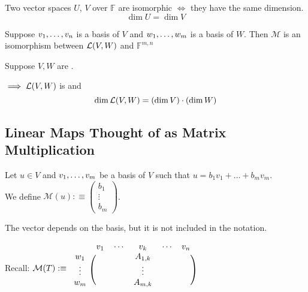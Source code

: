   \begin{thm}
    Two \fd vector spaces $U$, $V$ over $\mathbb{F}$ are isomorphic $\iff$ they have the same dimension. 
    \begin{equation}
      \dim U = \dim V
    \end{equation}
  \end{thm}

  \begin{thm}
    Suppose $v_1, \dots, v_n$ is a basis of $V$ and $w_1, \dots, w_m$ is a basis of $W$. Then $\mathcal{M}$ is an isomorphism between ${\mathcal{L}(V,W)}$ and $\mathbb{F}^{m,n}$
  \end{thm}

  \begin{thm}
    Suppose $V,W$ are \fd.
    
    $\implies {\mathcal{L}(V,W)}$ is \fd and
    \begin{equation}
      \dim {\mathcal{L}(V,W)} = (\dim V)\cdot(\dim W)
    \end{equation}
  \end{thm}

  \subsection{Linear Maps Thought of as Matrix Multiplication}

  \begin{mydef} 
    Let $u \in V$ and $v_1, \dots, v_m$ be a basis of $V$ such that $u=b_1v_1+\dots+b_mv_m$.
    \\
    We define
    $
    \mathcal{M}(u) :\equiv
    \left (
    \begin{matrix}
      b_1 \\ \vdots \\ b_m
    \end{matrix}
    \right )
    $. 
    
    The vector depends on the basis, but it is not included in the notation. 
  \end{mydef}

  Recall: $
  \mathcal{M} (T) :\equiv
  \begin{blockarray}{cccc}
    & v_1 \quad \cdots & v_k & \cdots \quad v_n \\
    \begin{block}{c(ccc)}
      w_1    & & A_{1,k} & \\
      \vdots & & \vdots & \\
      w_m    & & A_{m,k} & \\
    \end{block}
  \end{blockarray}
  $


